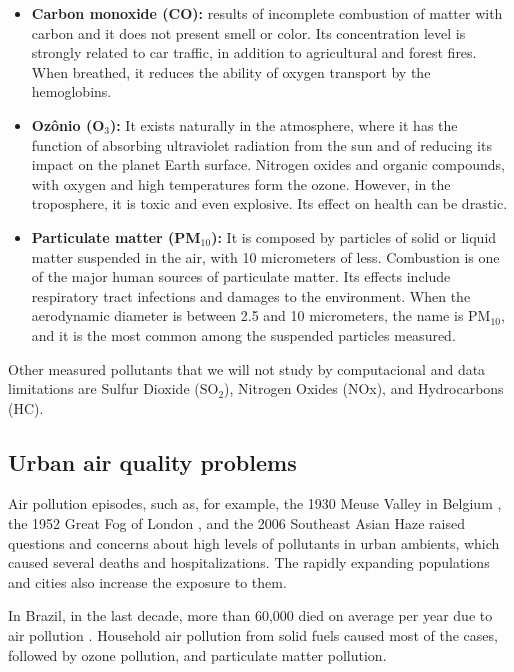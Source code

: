 \begin{itemize}
    \item \textbf{Carbon monoxide (CO):} results of incomplete combustion
    of matter with carbon and it does not present smell or color. Its
    concentration level is strongly related to car traffic, in addition to
    agricultural and forest fires. When breathed, it reduces the ability of
    oxygen transport by the hemoglobins.  

    \item \textbf{Ozônio (O$_3$):} It exists naturally in the atmosphere,
    where it has the function of absorbing ultraviolet radiation from the sun
    and of reducing its impact on the planet Earth surface. Nitrogen oxides and
    organic compounds, with oxygen and high temperatures form the ozone. However, in
    the troposphere, it is toxic and even explosive. Its
    effect on health can be drastic. 

    \item \textbf{Particulate matter (PM$_{10}$):} It is composed by particles
    of solid or liquid matter suspended in the air, with 10 micrometers of
    less. Combustion is one of the major human sources of particulate matter.
    Its effects include respiratory tract infections and damages to the
    environment. When the aerodynamic diameter is between 2.5 and 10
    micrometers, the name is PM$_{10}$, and it is the most common among the suspended particles measured.  

\end{itemize}

Other measured pollutants that we will not study by computacional and data
limitations are Sulfur Dioxide (SO$_2$), Nitrogen Oxides (NOx), and Hydrocarbons (HC).

\subsection{Urban air quality problems}

Air pollution episodes, such as, for example, the 1930 Meuse Valley in Belgium
\cite{nemery2001}, the 1952 Great Fog of London
\cite{polivka2018}, and the 2006 Southeast Asian Haze \cite{jones2006} raised
questions and concerns about high levels of pollutants in urban ambients,
which caused several deaths and hospitalizations. The rapidly expanding
populations and cities also increase the exposure to them.

In Brazil, in the last decade, more than 60,000 died on average per year due
to air pollution \cite{data-deaths-air-pollution}. Household air pollution
from solid fuels caused most of the cases, followed by ozone pollution, and
particulate matter pollution. 

